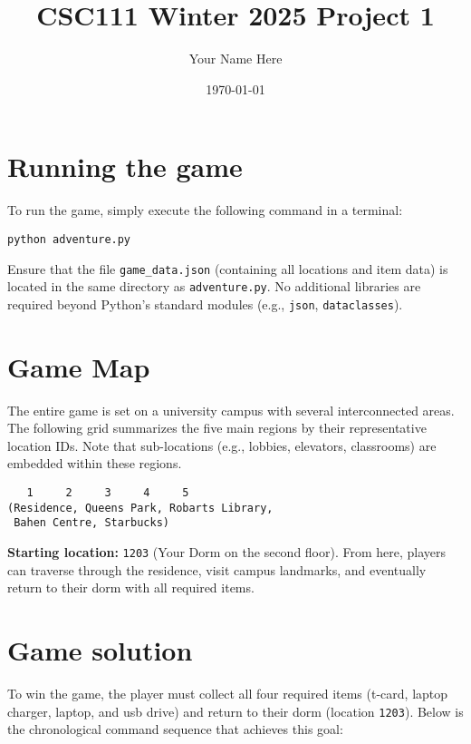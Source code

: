 \documentclass[11pt]{article}
\title{CSC111 Winter 2025 Project 1}
\author{Your Name Here}
\date{\today}
\begin{document}
\maketitle

\section*{Running the game}
To run the game, simply execute the following command in a terminal:
\begin{verbatim}
python adventure.py
\end{verbatim}
Ensure that the file \texttt{game\_data.json} (containing all locations and item data) is located in the same directory as \texttt{adventure.py}. No additional libraries are required beyond Python’s standard modules (e.g., \texttt{json}, \texttt{dataclasses}).

\section*{Game Map}
The entire game is set on a university campus with several interconnected areas. The following grid summarizes the five main regions by their representative location IDs. Note that sub-locations (e.g., lobbies, elevators, classrooms) are embedded within these regions.
\begin{verbatim}
   1     2     3     4     5
(Residence, Queens Park, Robarts Library, 
 Bahen Centre, Starbucks)
\end{verbatim}
\textbf{Starting location:} \texttt{1203} (Your Dorm on the second floor). From here, players can traverse through the residence, visit campus landmarks, and eventually return to their dorm with all required items.

\section*{Game solution}
To win the game, the player must collect all four required items (t-card, laptop charger, laptop, and usb drive) and return to their dorm (location \texttt{1203}). Below is the chronological command sequence that achieves this goal:
\end{document}
